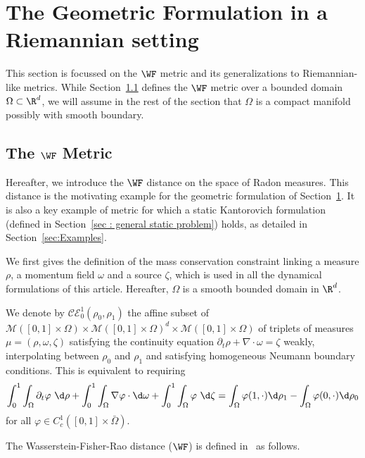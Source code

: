 
\section{The Geometric Formulation in a Riemannian setting}
\label{sec:geometry}

This section is focussed on the $\WF$ metric and its generalizations to Riemannian-like metrics. While Section~\ref{sec-wf-defn} defines the $\WF$ metric over a bounded domain $\Omega \subset \R^d$, we will assume in the rest of the section that $\Omega$ is a compact manifold possibly with smooth boundary.


\subsection{The $\WF$ Metric}
\label{sec-wf-defn}

Hereafter, we introduce the $\WF$ distance on the space of Radon measures. This distance is the motivating example for the geometric formulation of Section~\ref{sec:geometry}. It is also a key example of metric for which a static Kantorovich formulation (defined in Section~\ref{sec : general static problem}) holds, as detailed in Section~\ref{sec:Examples}. 

We first gives the definition of the mass conservation constraint linking a measure $\rho$, a momentum field $\omega$ and a source $\zeta$, which is used in all the dynamical formulations of this article. Hereafter, $\Omega$ is a smooth bounded domain in $\R^d$.

\begin{definition}
We denote by $\mathcal{CE}_0^1(\rho_0,\rho_1)$ the affine subset of $\mathcal{M}([0,1]\times \Omega)\times \mathcal{M}([0,1]\times \Omega)^d \times \mathcal{M}([0,1]\times \Omega)$ of triplets of measures $\mu=(\rho,\omega,\zeta)$ satisfying the continuity equation $\partial_t \rho + \nabla \cdot \omega = \zeta$ weakly, interpolating between $\rho_0$ and $\rho_1$ and satisfying homogeneous Neumann boundary conditions. This is equivalent to requiring
\begin{equation}
\label{eq:continuity weak}
\int_0^1 \int_{\Omega} \partial_t \varphi \ \d\rho + \int_0^1 \int_{\Omega} \nabla \varphi \cdot \d\omega + \int_0^1 \int_{\Omega} \varphi \ \d\zeta = \int_{\Omega} \varphi(1,\cdot)\d\rho_1 - \int_{\Omega} \varphi(0,\cdot)\d\rho_0
\end{equation}
for all $\varphi \in C^1_c([0,1]\times \bar{\Omega})$.
\end{definition}
The Wasserstein-Fisher-Rao distance ($\WF$) is defined in~\cite{ChizatOTFR2015,new2015kondratyev} as follows.

